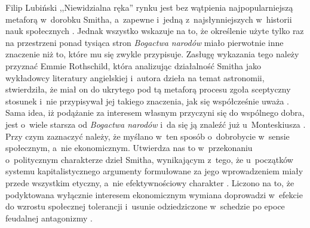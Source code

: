 \begin{artplenv}{Filip Lubiński}
,,Niewidzialna ręka'' rynku jest bez wątpienia najpopularniejszą metaforą w~dorobku
Smitha, a~zapewne i~jedną z~najsłynniejszych w~historii nauk społecznych
\parencite[s.~104]{cremaschi_metaphors_2002}.
Jednak wszystko
wskazuje na to, że określenie użyte tylko raz na przestrzeni ponad tysiąca stron \textit{Bogactwa narodów} miało
pierwotnie inne znaczenie niż to, które mu się zwykle przypisuje. Zasługę wykazania tego należy przyznać Emmie
Rothschild, która analizując działalność Smitha jako wykładowcy literatury angielskiej i~autora dzieła na temat
astronomii, stwierdziła, że miał on do ukrytego pod tą metaforą procesu zgoła sceptyczny stosunek i~nie przypisywał jej
takiego znaczenia, jak się współcześnie uważa
\parencite[s.~116–153]{rothschild_economic_2002}.
Sama idea, iż
podążanie za interesem własnym przyczyni się do wspólnego dobra, jest o~wiele starsza od \textit{Bogactwa narodów} i~da
się ją znaleźć już u~Monteskiusza
\parencite[s.~50]{montesquieu_o_2009}.
Przy czym zaznaczyć należy, że
myślano w~ten sposób o~dobrobycie w~sensie społecznym, a~nie ekonomicznym. Utwierdza nas to w~przekonaniu o~politycznym
charakterze dzieł Smitha, wynikającym z~tego, że u~początków systemu kapitalistycznego argumenty formułowane za jego
wprowadzeniem miały przede wszystkim etyczny, a~nie efektywnościowy charakter
\parencite[s.~37–45]{hirschman_namietnosci_1997}.
Liczono na to, że podyktowana wyłącznie interesem ekonomicznym wymiana doprowadzi w~efekcie do wzrostu
społecznej tolerancji i~usunie odziedziczone w~schedzie po epoce feudalnej antagonizmy
\parencite[s.~23–36]{muller_mind_2003}.


\end{artplenv}
